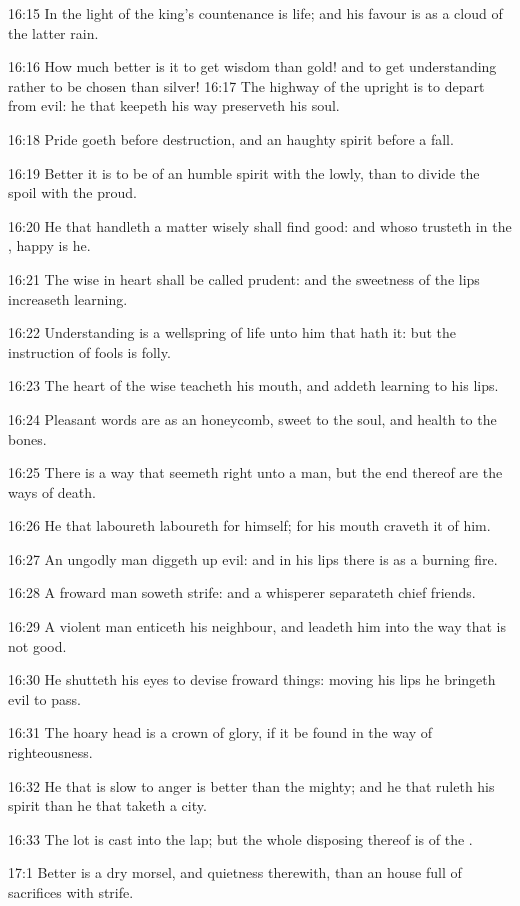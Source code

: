 16:15 In the light of the king's countenance is life; and his favour is as a cloud of the latter rain.

16:16 How much better is it to get wisdom than gold! and to get understanding rather to be chosen than silver!  16:17 The highway of the upright is to depart from evil: he that keepeth his way preserveth his soul.

16:18 Pride goeth before destruction, and an haughty spirit before a fall.

16:19 Better it is to be of an humble spirit with the lowly, than to divide the spoil with the proud.

16:20 He that handleth a matter wisely shall find good: and whoso trusteth in the \LORD, happy is he.

16:21 The wise in heart shall be called prudent: and the sweetness of the lips increaseth learning.

16:22 Understanding is a wellspring of life unto him that hath it: but the instruction of fools is folly.

16:23 The heart of the wise teacheth his mouth, and addeth learning to his lips.

16:24 Pleasant words are as an honeycomb, sweet to the soul, and health to the bones.

16:25 There is a way that seemeth right unto a man, but the end thereof are the ways of death.

16:26 He that laboureth laboureth for himself; for his mouth craveth it of him.

16:27 An ungodly man diggeth up evil: and in his lips there is as a burning fire.

16:28 A froward man soweth strife: and a whisperer separateth chief friends.

16:29 A violent man enticeth his neighbour, and leadeth him into the way that is not good.

16:30 He shutteth his eyes to devise froward things: moving his lips he bringeth evil to pass.

16:31 The hoary head is a crown of glory, if it be found in the way of righteousness.

16:32 He that is slow to anger is better than the mighty; and he that ruleth his spirit than he that taketh a city.

16:33 The lot is cast into the lap; but the whole disposing thereof is of the \LORD.

17:1 Better is a dry morsel, and quietness therewith, than an house full of sacrifices with strife.

